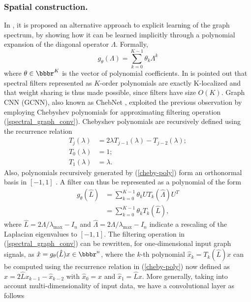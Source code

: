 \documentclass[runningheads]{llncs}
\begin{document}
\subsubsection{Spatial construction.}
In \cite{DBLP:journals/corr/DefferrardBV16}, it is proposed an alternative approach to explicit learning of the graph spectrum, by showing how it can be learned implicitly through a polynomial expansion of the diagonal operator $\Lambda$. Formally,
\begin{equation}
	g_{\theta}\left( \Lambda \right) = \sum_{k=0}^{K-1} \theta_{k} \Lambda^{k}
\end{equation}
where $\theta \in \bbbr^{K}$ is the vector of polynomial coefficients. In \cite{DBLP:journals/corr/DefferrardBV16} is pointed out that spectral filters represented as $K$-order polynomials are exactly K-localized and that weight sharing is thus made possible, since filters have size $O(K)$. Graph CNN (GCNN), also known as ChebNet \cite{DBLP:journals/corr/DefferrardBV16}, exploited the previous observation by employing Chebyshev polynomials for approximating filtering operation (\ref{spectral_graph_conv}). Chebyshev polynomials are recursively defined using the recurrence relation
\begin{equation}\label{cheby-poly}
	\begin{split}
		T_{j} (\lambda) & = 2 \lambda T_{j-1} (\lambda) - T_{j-2} (\lambda); \\ T_{0} (\lambda) &= 1; \\ T_{1} (\lambda) &= \lambda.
	\end{split}
\end{equation}
Also, polynomials recursively generated by (\ref{cheby-poly}) form an orthonormal basis in $\left[-1, 1\right]$ \cite{DBLP:journals/corr/BronsteinBLSV16,DBLP:journals/corr/DefferrardBV16}. A filter can thus be represented as a polynomial of the form
\begin{equation}
	\begin{split}
  g_{\theta} (\hat{L}) & = \sum_{k=0}^{K-1} \theta_k U T_{k}(\hat{\Lambda}) U^{T} \\ & = \sum_{k=0}^{K-1} \theta_{k} T_{k} (\hat{L}),
  	\end{split}
\end{equation}
where $\hat{L} = 2 \Lambda / \lambda_{\max} - I_{n}$ and $\hat{\Lambda} = 2 \Lambda / \lambda_{\max} - I_{n}$ indicate a rescaling of the Laplacian eigenvalues to $\left[-1, 1\right]$. The filtering operation in (\ref{spectral_graph_conv}) can be rewritten, for one-dimensional input graph signals, as $\hat{x} = g_{\theta} (\hat{L}) x \in \bbbr^{n}$, where the $k$-th polynomial $\hat{x}_{k} = T_{k} (\hat{L}) x$ can be computed using the recurrence relation in (\ref{cheby-poly}) now defined as $\hat{x} = 2 \hat{L} x_{k-1} - \hat{x}_{k-2}$ with $\hat{x}_{0} = x$ and $\hat{x}_{1} = \hat{L} x$. More generally, taking into account multi-dimensionality of input data, we have a convolutional layer as follows
\end{document}
